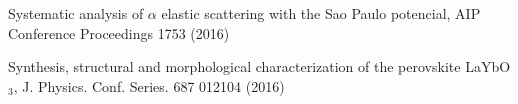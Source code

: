 



\begin{cventries}

  \cventry
    {} %
    {} %
    {} %
    {} %
    {
      \begin{cvitems} %
\item {Systematic analysis of $\alpha$ elastic scattering with the Sao Paulo potencial, AIP Conference Proceedings 1753 (2016)}
\item {Synthesis, structural and morphological characterization of the perovskite LaYbO$_3$, J. Physics. Conf. Series. 687 012104 (2016)}
      \end{cvitems}
    }

\end{cventries}
